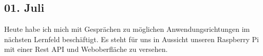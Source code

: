 \subsection{01. Juli}
Heute habe ich mich mit Gesprächen zu möglichen Anwendungsrichtungen im nächsten Lernfeld beschäftigt. Es steht für uns in Aussicht unseren Raspberry Pi mit einer Rest API und Weboberfläche zu versehen.